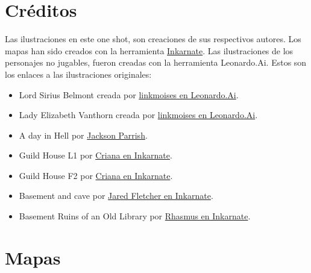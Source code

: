 \documentclass[10pt,twoside,twocolumn,openany]{dndbook}
\begin{document}





\section{Créditos}

Las ilustraciones en este one shot, son creaciones de sus respectivos autores. Los mapas han sido 
creados con la herramienta \href{https://inkarnate.com/}{Inkarnate}. Las ilustraciones de los 
personajes no jugables, fueron creadas con la herramienta Leonardo.Ai. Estos son los enlaces a las 
ilustraciones originales:

\begin{itemize}
  \item Lord Sirius Belmont creada por \href{https://cdn.leonardo.ai/users/898407a5-5b36-4dae-87cc-c51a8041e826/generations/8ac651a0-9be3-4896-85f0-2ce0d8e01215/DreamShaper_v7_dungeon_and_dragons_style_illustration_charisma_1.jpg}{linkmoises en Leonardo.Ai}.
  \item Lady Elizabeth Vanthorn creada por \href{https://cdn.leonardo.ai/users/898407a5-5b36-4dae-87cc-c51a8041e826/generations/a5c78c2e-61f0-478a-8005-03b46068bcdc/DreamShaper_v7_dungeon_and_dragons_style_illustration_charisma_1.jpg}{linkmoises en Leonardo.Ai}.
  \item A day in Hell por \href{https://licensing.pixels.com/featured/a-day-in-hell-jackson-parrish.html}{Jackson Parrish}.
  \item Guild House L1 por \href{https://inkarnate.com/p/RVAA0X-criana/maps/79j1zW-guild-house/}{Criana en Inkarnate}.
  \item Guild House F2 por \href{https://inkarnate.com/p/RVAA0X-criana/maps/lZznw8-guild-house-f2/}{Criana en Inkarnate}.
  \item Basement and cave por \href{https://inkarnate.com/p/49vmYo-jared-fletcher/maps/kdGk9r-basement-and-cave/}{Jared Fletcher en Inkarnate}.
  \item Basement Ruins of an Old Library por \href{https://inkarnate.com/p/R1zAY7-rhasmus/maps/lJ1wxd-day-89-365-basement-ruins-of-an-old-library/}{Rhasmus en Inkarnate}.
\end{itemize}


\section{Mapas}
\end{document}
